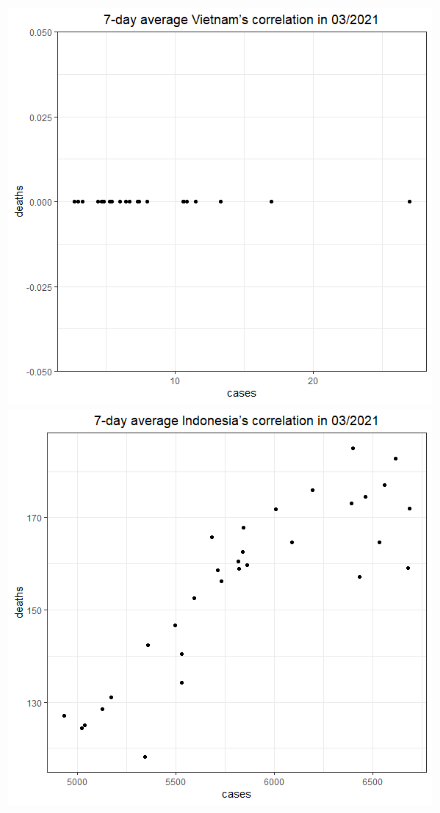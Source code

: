 \documentclass[english,10pt,table]{beamer}
\begin{document}
{\begin{figure}[H]
\begin{center}
        \includegraphics[scale = 0.2]{ix/ix.3/VN_03_2021.png}
        \includegraphics[scale = 0.2]{ix/ix.3/IDN_03_2021.png}

\end{center}
\end{figure}}
\end{document}
